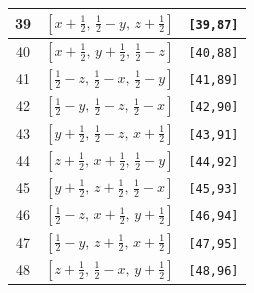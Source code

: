 \documentclass[fleqn,8pt]{jsarticle}
\begin{document}
\begin{longtable}{ccc}
39 & $\left[ x + \frac{1}{2},\, \frac{1}{2} - y,\, z + \frac{1}{2} \right]$ & {\tt [39,87]} \\ \hline
40 & $\left[ x + \frac{1}{2},\, y + \frac{1}{2},\, \frac{1}{2} - z \right]$ & {\tt [40,88]} \\ \hline
41 & $\left[ \frac{1}{2} - z,\, \frac{1}{2} - x,\, \frac{1}{2} - y \right]$ & {\tt [41,89]} \\ \hline
42 & $\left[ \frac{1}{2} - y,\, \frac{1}{2} - z,\, \frac{1}{2} - x \right]$ & {\tt [42,90]} \\ \hline
43 & $\left[ y + \frac{1}{2},\, \frac{1}{2} - z,\, x + \frac{1}{2} \right]$ & {\tt [43,91]} \\ \hline
44 & $\left[ z + \frac{1}{2},\, x + \frac{1}{2},\, \frac{1}{2} - y \right]$ & {\tt [44,92]} \\ \hline
45 & $\left[ y + \frac{1}{2},\, z + \frac{1}{2},\, \frac{1}{2} - x \right]$ & {\tt [45,93]} \\ \hline
46 & $\left[ \frac{1}{2} - z,\, x + \frac{1}{2},\, y + \frac{1}{2} \right]$ & {\tt [46,94]} \\ \hline
47 & $\left[ \frac{1}{2} - y,\, z + \frac{1}{2},\, x + \frac{1}{2} \right]$ & {\tt [47,95]} \\ \hline
48 & $\left[ z + \frac{1}{2},\, \frac{1}{2} - x,\, y + \frac{1}{2} \right]$ & {\tt [48,96]} \\
\end{longtable}
\end{document}
